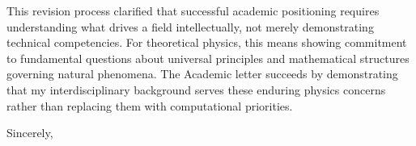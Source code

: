 \hspace{1.5em} This revision process clarified that successful academic positioning requires understanding what drives a field intellectually, not merely demonstrating technical competencies. For theoretical physics, this means showing commitment to fundamental questions about universal principles and mathematical structures governing natural phenomena. The Academic letter succeeds by demonstrating that my interdisciplinary background serves these enduring physics concerns rather than replacing them with computational priorities.
\vspace{1.0em}

Sincerely,\\
\myName\\[1.0em]
